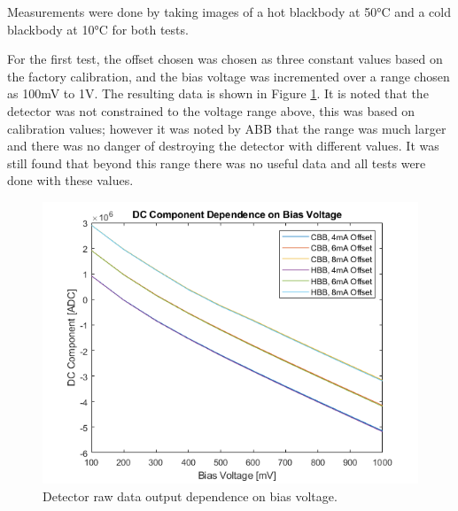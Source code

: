 Measurements were done by taking images of a hot blackbody at 50°C and a cold blackbody at 10°C for both tests.

For the first test, the offset chosen was chosen as three constant values based on the factory calibration, and the bias voltage was incremented over a range chosen as 100mV to 1V. The resulting data is shown in Figure \ref{fig:dc_dep_on_bias}. It is noted that the detector was not constrained to the voltage range above, this was based on calibration values; however it was noted by ABB that the range was much larger and there was no danger of destroying the detector with different values. It was still found that beyond this range there was no useful data and all tests were done with these values.

\begin{figure}[h]
  \centering
  \includegraphics[width=0.9\linewidth]{chap6_images/verification/dc_component_dependence_on_bias_voltage.png}
  \caption{Detector raw data output dependence on bias voltage.}
  \label{fig:dc_dep_on_bias}
\end{figure}

